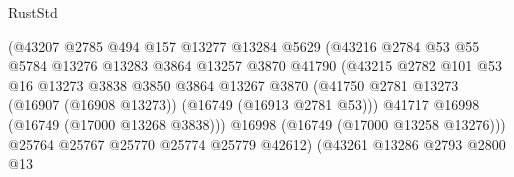 \begin{lexlean}{RustStd}
\begin{coremodule}
                                        (@43207
                                          @2785
                                          @494
                                          @157
                                          @13277
                                          @13284
                                          @5629
                                          (@43216
                                            @2784
                                            @53
                                            @55
                                            @5784
                                            @13276
                                            @13283
                                            @3864
                                            @13257
                                            @3870
                                            @41790
                                            (@43215
                                              @2782
                                              @101
                                              @53
                                              @16
                                              @13273
                                              @3838
                                              @3850
                                              @3864
                                              @13267
                                              @3870
                                              (@41750
                                                @2781
                                                @13273
                                                (@16907 (@16908 @13273))
                                                (@16749 (@16913 @2781 @53)))
                                              @41717
                                              @16998
                                              (@16749 (@17000 @13268 @3838)))
                                            @16998
                                            (@16749 (@17000 @13258 @13276)))
                                          @25764
                                          @25767
                                          @25770
                                          @25774
                                          @25779
                                          @42612)
                                        (@43261
                                          @13286
                                          @2793
                                          @2800
                                          @13

\end{coremodule}
\end{lexlean}
